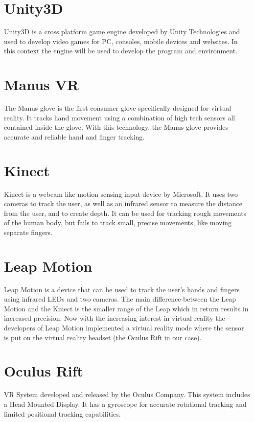 \documentclass[11pt,a4paper]{report}
\begin{document}
\section*{Unity3D}
Unity3D is a cross platform game engine developed by Unity Technologies and used to
develop video games for PC, consoles, mobile devices and websites. In this context the engine
will be used to develop the program and environment.
\section*{Manus VR}
The Manus glove is the first consumer glove specifically designed for virtual reality. It tracks
hand movement using a combination of high tech sensors all contained inside the glove. With
this technology, the Manus glove provides accurate and reliable hand and finger tracking.
\section*{Kinect}
Kinect is a webcam like motion sensing input device by Microsoft. It uses two cameras to
track the user, as well as an infrared sensor to measure the distance from the user, and to
create depth. It can be used for tracking rough movements of the human body, but fails to
track small, precise movements, like moving separate fingers.
\section*{Leap Motion}
Leap Motion is a device that can be used to track the user’s hands and fingers using infrared
LEDs and two cameras. The main difference between the Leap Motion and the Kinect is the
smaller range of the Leap which in return results in increased precision. Now with the
increasing interest in virtual reality the developers of Leap Motion implemented a virtual
reality mode where the sensor is put on the virtual reality headset (the Oculus Rift in our
case).
\section*{Oculus Rift}
VR System developed and released by the Oculus Company. This system includes a Head
Mounted Display. It has a gyroscope for accurate rotational tracking and limited positional
tracking capabilities.
\end{document}
